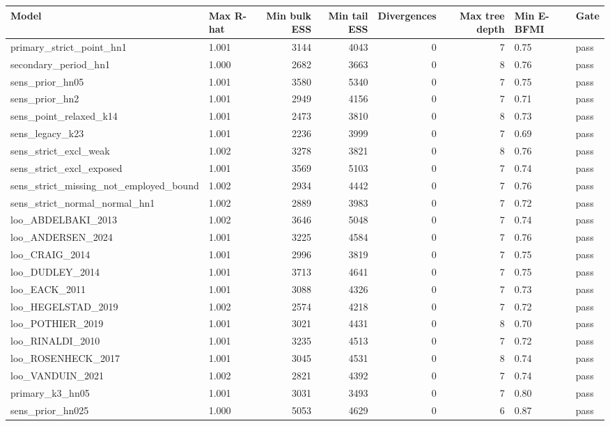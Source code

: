 
\begin{tabular}{llrrrrll}
\toprule
Model & Max R-hat & Min bulk ESS & Min tail ESS & Divergences & Max tree depth & Min E-BFMI & Gate\\
\midrule
primary\_strict\_point\_hn1 & 1.001 & 3144 & 4043 & 0 & 7 & 0.75 & pass\\
secondary\_period\_hn1 & 1.000 & 2682 & 3663 & 0 & 8 & 0.76 & pass\\
sens\_prior\_hn05 & 1.001 & 3580 & 5340 & 0 & 7 & 0.75 & pass\\
sens\_prior\_hn2 & 1.001 & 2949 & 4156 & 0 & 7 & 0.71 & pass\\
sens\_point\_relaxed\_k14 & 1.001 & 2473 & 3810 & 0 & 8 & 0.73 & pass\\
sens\_legacy\_k23 & 1.001 & 2236 & 3999 & 0 & 7 & 0.69 & pass\\
sens\_strict\_excl\_weak & 1.002 & 3278 & 3821 & 0 & 8 & 0.76 & pass\\
sens\_strict\_excl\_exposed & 1.001 & 3569 & 5103 & 0 & 7 & 0.74 & pass\\
sens\_strict\_missing\_not\_employed\_bound & 1.002 & 2934 & 4442 & 0 & 7 & 0.76 & pass\\
sens\_strict\_normal\_normal\_hn1 & 1.002 & 2889 & 3983 & 0 & 7 & 0.72 & pass\\
loo\_ABDELBAKI\_2013 & 1.002 & 3646 & 5048 & 0 & 7 & 0.74 & pass\\
loo\_ANDERSEN\_2024 & 1.001 & 3225 & 4584 & 0 & 7 & 0.76 & pass\\
loo\_CRAIG\_2014 & 1.001 & 2996 & 3819 & 0 & 7 & 0.75 & pass\\
loo\_DUDLEY\_2014 & 1.001 & 3713 & 4641 & 0 & 7 & 0.75 & pass\\
loo\_EACK\_2011 & 1.001 & 3088 & 4326 & 0 & 7 & 0.73 & pass\\
loo\_HEGELSTAD\_2019 & 1.002 & 2574 & 4218 & 0 & 7 & 0.72 & pass\\
loo\_POTHIER\_2019 & 1.001 & 3021 & 4431 & 0 & 8 & 0.70 & pass\\
loo\_RINALDI\_2010 & 1.001 & 3235 & 4513 & 0 & 7 & 0.72 & pass\\
loo\_ROSENHECK\_2017 & 1.001 & 3045 & 4531 & 0 & 8 & 0.74 & pass\\
loo\_VANDUIN\_2021 & 1.002 & 2821 & 4392 & 0 & 7 & 0.74 & pass\\
primary\_k3\_hn05 & 1.001 & 3031 & 3493 & 0 & 7 & 0.80 & pass\\
sens\_prior\_hn025 & 1.000 & 5053 & 4629 & 0 & 6 & 0.87 & pass\\

\end{tabular}
